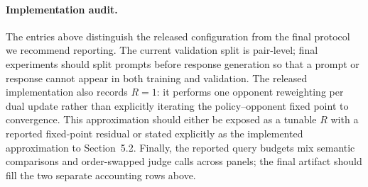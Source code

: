 \documentclass{article}
\theoremstyle{remark}
\theoremstyle{plain}
\begin{document}
\paragraph{Implementation audit.}
The entries above distinguish the released configuration from the final protocol
we recommend reporting. The current validation split is pair-level; final
experiments should split prompts before response generation so that a prompt or
response cannot appear in both training and validation. The released implementation
also records $R=1$: it performs one opponent reweighting per dual update rather
than explicitly iterating the policy--opponent fixed point to convergence. This
approximation should either be exposed as a tunable $R$ with a reported
fixed-point residual or stated explicitly as the implemented approximation to
Section~5.2. Finally, the reported query budgets mix semantic comparisons and
order-swapped judge calls across panels; the final artifact should fill the two
separate accounting rows above.
\end{document}
